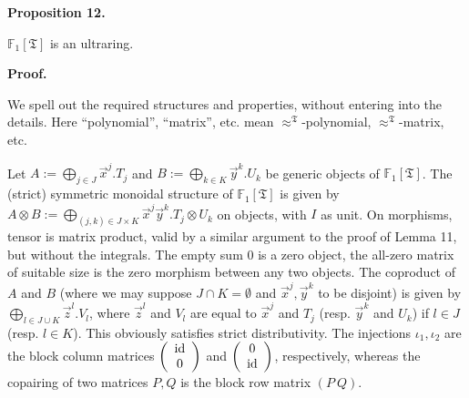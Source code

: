 \documentclass[10pt,a4paper]{amsart}
\begin{document}
\par\medskip\noindent\textbf{Proposition 12.}\par
 
 
$\mathbb{F}_{1}[\mathfrak{T}]$ is an ultraring.\par
 
 
 
 
 
\par\medskip\noindent\textbf{Proof.}\par
 
 
We spell out the required structures and properties, without entering into the details. Here “polynomial”, “matrix”, etc. mean $\approx^{\mathfrak{T}}$-polynomial, $\approx^{\mathfrak{T}}$-matrix, etc.\par
 
 
 
Let $A:=\bigoplus_{j\in J}\vec{x}^{j}.T_{j}$ and $B:=\bigoplus_{k\in K}\vec{y}^{k}.U_{k}$ be generic objects of $\mathbb{F}_{1}[\mathfrak{T}]$. The (strict) symmetric monoidal structure of $\mathbb{F}_{1}[\mathfrak{T}]$ is given by $A\otimes B:=\bigoplus_{(j,k)\in J\times K}\vec{x}^{j}\vec{y}^{k}.T_{j}\otimes U%
_{k}$ on objects, with $I$ as unit. On morphisms, tensor is matrix product, valid by a similar argument to the proof of Lemma 11, but without the integrals. The empty sum $0$ is a zero object, the all-zero matrix of suitable size is the zero morphism between any two objects. The coproduct of $A$ and $B$ (where we may suppose $J\cap K=\emptyset$ and $\vec{x}^{j},\vec{y}^{k}$ to be disjoint) is given by $\bigoplus_{l\in J\cup K}\vec{z}^{l}.V_{l}$, where $\vec{z}^{l}$ and $V_{l}$ are equal to $\vec{x}^{j}$ and $T_{j}$ (resp. $\vec{y}^{k}$ and $U_{k}$) if $l\in J$ (resp. $l\in K$). This obviously satisfies strict distributivity. The injections $\iota_{1},\iota_{2}$ are the block column matrices $\left(\begin{array}[]{c}\mathrm{id}\\
0\end{array}\right)$ and $\left(\begin{array}[]{c}0\\
\mathrm{id}\end{array}\right)$, respectively, whereas the copairing of two matrices $P,Q$ is the block row matrix $(P\ Q)$.\par
 
\end{document}
